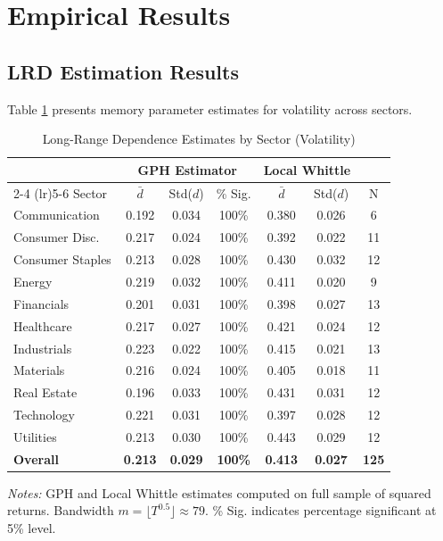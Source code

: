 \documentclass[12pt,a4paper]{article}
\begin{document}
\newpage
\section{Empirical Results}
\label{sec:results}

\subsection{LRD Estimation Results}

Table \ref{tab:lrd_estimates} presents memory parameter estimates for volatility across sectors.

\begin{table}[H]
\centering
\caption{Long-Range Dependence Estimates by Sector (Volatility)}
\label{tab:lrd_estimates}
\small
\begin{tabular}{lcccccc}
\toprule
 & \multicolumn{3}{c}{GPH Estimator} & \multicolumn{2}{c}{Local Whittle} & \\
\cmidrule(lr){2-4} \cmidrule(lr){5-6}
Sector & $\bar{d}$ & Std($d$) & \% Sig. & $\bar{d}$ & Std($d$) & N \\
\midrule
Communication & 0.192 & 0.034 & 100\% & 0.380 & 0.026 & 6 \\
Consumer Disc. & 0.217 & 0.024 & 100\% & 0.392 & 0.022 & 11 \\
Consumer Staples & 0.213 & 0.028 & 100\% & 0.430 & 0.032 & 12 \\
Energy & 0.219 & 0.032 & 100\% & 0.411 & 0.020 & 9 \\
Financials & 0.201 & 0.031 & 100\% & 0.398 & 0.027 & 13 \\
Healthcare & 0.217 & 0.027 & 100\% & 0.421 & 0.024 & 12 \\
Industrials & 0.223 & 0.022 & 100\% & 0.415 & 0.021 & 13 \\
Materials & 0.216 & 0.024 & 100\% & 0.405 & 0.018 & 11 \\
Real Estate & 0.196 & 0.033 & 100\% & 0.431 & 0.031 & 12 \\
Technology & 0.221 & 0.031 & 100\% & 0.397 & 0.028 & 12 \\
Utilities & 0.213 & 0.030 & 100\% & 0.443 & 0.029 & 12 \\
\midrule
\textbf{Overall} & \textbf{0.213} & \textbf{0.029} & \textbf{100\%} & \textbf{0.413} & \textbf{0.027} & \textbf{125} \\
\bottomrule
\end{tabular}
\begin{tablenotes}\small
\item \textit{Notes:} GPH and Local Whittle estimates computed on full sample of squared returns. Bandwidth $m = \lfloor T^{0.5} \rfloor \approx 79$. \% Sig. indicates percentage significant at 5\% level.
\end{tablenotes}
\end{table}
\end{document}
